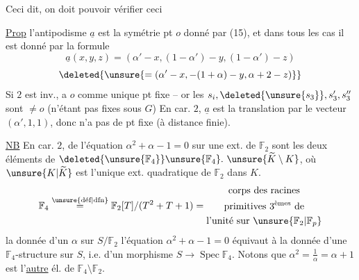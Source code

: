 Ceci dit, on doit pouvoir  vérifier ceci

\uline{Prop} l'antipodisme $\underline{a}$ est la symétrie  pt $o$ donné par (15), et dans tous les cas il est donné par la formule
\[
\underline{a}(x,y,z)=(\alpha'-x,(1-\alpha')-y,(1-\alpha')-z)\tag*{(17)}
\]
\[
\deleted{\unsure{=(\alpha'-x,-(1+\alpha)-y,\alpha+2-z)}}
\]
Si $2$ est inv.,  a $o$ comme unique pt fixe -- or les $s_i,\deleted{\unsure{s_3}},s'_3,s''_3$ sont $\ne o$ (n'étant pas fixes sous $G$) En car.  $2$, $\underline{a}$ est la translation par le vecteur $(\alpha',1,1)$, donc n'a pas de pt fixe (à distance finie).

\uline{NB} En car. $2$,  de l'équation $\alpha^2+\alpha-1=0$ sur une ext.  de $\mathbb{F}_2$ sont les deux éléments de $\deleted{\unsure{\mathbb{F}_4}}\unsure{\mathbb{F}_4}.\ \unsure{\widetilde{K}\setminus K}$, où $\unsure{K|\widetilde{K}}$ est l'unique ext. quadratique de $\mathbb{F}_2$ dans $K$. 
\[
\mathbb{F}_4\overset{\unsure{\text{déf}|\text{dfn}}}{=}\mathbb{F}_2[T]/(T^2+T+1)=\begin{gathered}\text{corps des racines}\\\text{primitives }3^{\text{èmes}}\text{ de}\\\text{l'unité sur }\unsure{\mathbb{F}_2|\mathbb{F}_p}\end{gathered}
\]
la donnée d'un $\alpha$ sur $S/\mathbb{F}_2$  l'équation $\alpha^2+\alpha-1=0$ équivaut à la donnée d'une $\mathbb{F}_4$-structure sur $S$, i.e. d'un morphisme $S\longrightarrow\operatorname{Spec}\mathbb{F}_4$. Notons que $\alpha^2=\frac1\alpha=\alpha+1$ est l'\uline{autre} él. de $\mathbb{F}_4\setminus\mathbb{F}_2$.
